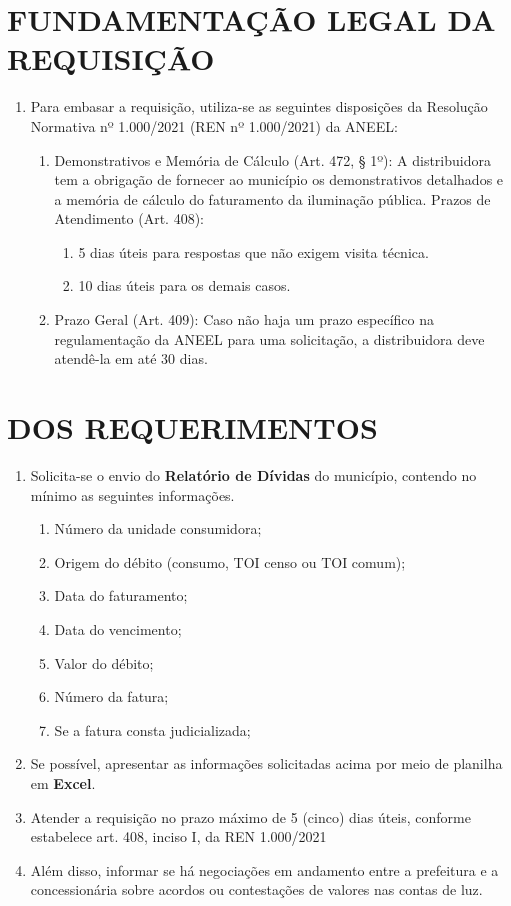 \newcommand{\tipoRequerimento}{Solicitação de Relatório de Dívidas}

\section{FUNDAMENTAÇÃO LEGAL DA REQUISIÇÃO}

\begin{enumerate}[resume]
\item
  Para embasar a requisição, utiliza-se as seguintes disposições da Resolução Normativa nº 1.000/2021 (REN nº 1.000/2021) da ANEEL:
  \begin{enumerate}
  \item
    Demonstrativos e Memória de Cálculo (Art. 472, § 1º): A distribuidora tem a obrigação de fornecer ao município os demonstrativos detalhados e a memória de cálculo do faturamento da iluminação pública. Prazos de Atendimento (Art. 408):
    \begin{enumerate}
      \item  
      5 dias úteis para respostas que não exigem visita técnica.
      \item 
      10 dias úteis para os demais casos.
    \end{enumerate}
  \item 
  Prazo Geral (Art. 409): Caso não haja um prazo específico na regulamentação da ANEEL para uma solicitação, a distribuidora deve atendê-la em até 30 dias.
  \end{enumerate}
\end{enumerate}

\section{DOS REQUERIMENTOS}

\begin{enumerate}[resume]
\item Solicita-se o envio do \textbf{Relatório de Dívidas} do município, contendo no mínimo as seguintes informações.
\begin{enumerate}
  \item Número da unidade consumidora;
  \item Origem do débito (consumo, TOI censo ou TOI comum);
  \item Data do faturamento;
  \item Data do vencimento;
  \item Valor do débito;
  \item Número da fatura;
  \item Se a fatura consta judicializada;
\end{enumerate}
\item Se possível, apresentar as informações solicitadas acima por meio de planilha em \textbf{Excel}.
\item Atender a requisição no prazo máximo de 5 (cinco) dias úteis, conforme estabelece art. 408, inciso I, da REN 1.000/2021
\item Além disso, informar se há negociações em andamento entre a prefeitura e a concessionária sobre acordos ou contestações de valores nas contas de luz.
\end{enumerate}


